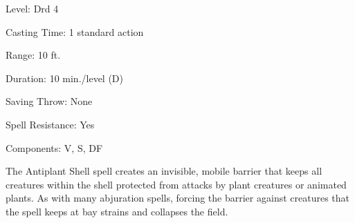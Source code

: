 
\begin{description*}
\item[Level:] Drd 4
\item[Casting Time:] 1 standard action
\item[Range:] 10 ft.
\item[Duration:] 10 min./level (D)
\item[Saving Throw:] None
\item[Spell Resistance:] Yes
\item[Components:] V, S, DF
\end{description*}

The Antiplant Shell spell creates an invisible, mobile barrier that keeps
all creatures within the shell protected from attacks by plant creatures or animated
plants. As with many abjuration spells, forcing the barrier against creatures that
the spell keeps at bay strains and collapses the field.